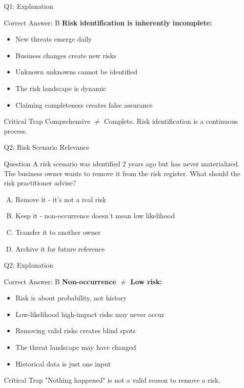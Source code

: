 \documentclass{beamer}
\begin{document}
			\begin{frame}{Q1: Explanation}
				\begin{block}{Correct Answer: B}
					\textbf{Risk identification is inherently incomplete:}
					\begin{itemize}
						\item New threats emerge daily
						\item Business changes create new risks
						\item Unknown unknowns cannot be identified
						\item The risk landscape is dynamic
						\item Claiming completeness creates false assurance
					\end{itemize}
				\end{block}
				\begin{alertblock}{Critical Trap}
					Comprehensive $\neq$ Complete. Risk identification is a continuous process.
				\end{alertblock}
			\end{frame}
			
			\begin{frame}{Q2: Risk Scenario Relevance}
				\begin{block}{Question}
					A risk scenario was identified 2 years ago but has never materialized. The business owner wants to remove it from the risk register. What should the risk practitioner advise?
				\end{block}
				\begin{enumerate}[(A)]
					\item Remove it - it's not a real risk
					\item Keep it - non-occurrence doesn't mean low likelihood
					\item Transfer it to another owner
					\item Archive it for future reference
				\end{enumerate}
			\end{frame}
			
			\begin{frame}{Q2: Explanation}
				\begin{block}{Correct Answer: B}
					\textbf{Non-occurrence $\neq$ Low risk:}
					\begin{itemize}
						\item Risk is about probability, not history
						\item Low-likelihood high-impact risks may never occur
						\item Removing valid risks creates blind spots
						\item The threat landscape may have changed
						\item Historical data is just one input
					\end{itemize}
				\end{block}
				\begin{alertblock}{Critical Trap}
					"Nothing happened" is not a valid reason to remove a risk.
				\end{alertblock}
			\end{frame}
			
\end{document}
